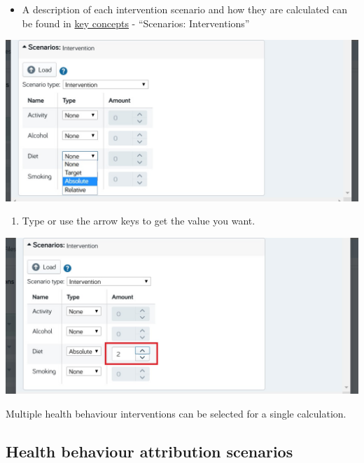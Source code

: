 \documentclass[]{book}
\providecommand{\tightlist}{%
  \setlength{\itemsep}{0pt}\setlength{\parskip}{0pt}}
\begin{document}
\begin{itemize}
\tightlist
\item
  A description of each intervention scenario and how they are
  calculated can be found in \protect\hyperlink{keyconcepts}{key
  concepts} - ``Scenarios: Interventions''
\end{itemize}

\begin{center}\includegraphics{Images/Scenario-Intervention-Abs} \end{center}

\begin{enumerate}
\def\labelenumi{\arabic{enumi}.}
\setcounter{enumi}{3}
\tightlist
\item
  Type or use the arrow keys to get the value you want.
\end{enumerate}

\begin{center}\includegraphics{Images/Scenario-Intervention-Abs2} \end{center}

Multiple health behaviour interventions can be selected for a single
calculation.

\subsection{Health behaviour attribution
scenarios}\label{health-behaviour-attribution-scenarios}
\end{document}
